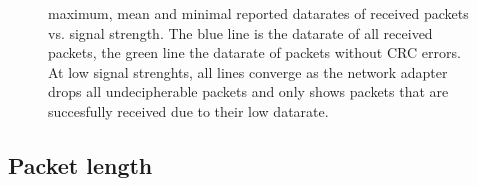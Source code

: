 \documentclass{article}
\begin{document}
\begin{figure}
		\caption{maximum, mean and minimal reported datarates of received packets vs. signal strength. The blue line is the datarate of all received packets, the green line the datarate of packets without CRC errors. At low signal strenghts, all lines converge as the network adapter drops all undecipherable packets and only shows packets that are succesfully received due to their low datarate.}
		\label{fig:datasignal}
\end{figure}

\subsection{Packet length}


\printbibliography
\end{document}

